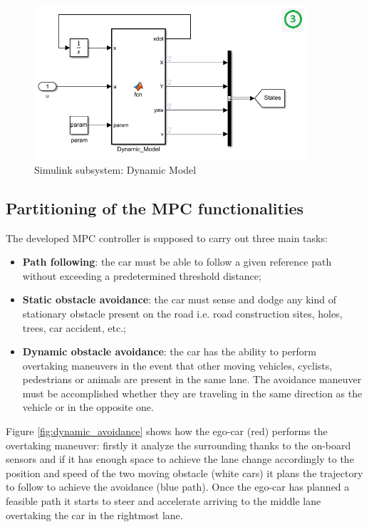 \begin{figure}[H]
    \centering
    \includegraphics[width=0.9\textwidth]{Figures/simulink_dyn_mod_mod.png}
    \caption{Simulink subsystem: Dynamic Model}
    \label{fig:simulink_dyn_mod_mod}
\end{figure} 





\subsection{Partitioning of the MPC functionalities}
The developed MPC controller is supposed to carry out three main tasks: 
\begin{itemize}
    \item \textbf{Path following}: the car must be able to follow a given reference path without exceeding a predetermined threshold distance;
    \item \textbf{Static obstacle avoidance}: the car must sense and dodge any kind of stationary obstacle present on the road i.e. road construction sites, holes, trees,  car accident, etc.;
    \item \textbf{Dynamic obstacle avoidance}: the car has the ability to perform overtaking maneuvers in the event that other moving vehicles, cyclists, pedestrians or animals are present in the same lane. The avoidance maneuver must be accomplished whether they are traveling in the same direction as the vehicle or in the opposite one.
\end{itemize}
Figure \ref{fig:dynamic_avoidance} shows how the ego-car (red) performs the overtaking maneuver: firstly it analyze the surrounding thanks to the on-board sensors and if it has enough space to achieve the lane change accordingly to the position and speed of the two moving obstacle (white cars) it plans the trajectory to follow to achieve the avoidance (blue path). Once the ego-car has planned a feasible path it starts to steer and accelerate arriving to the middle lane overtaking the car in the rightmost lane.


